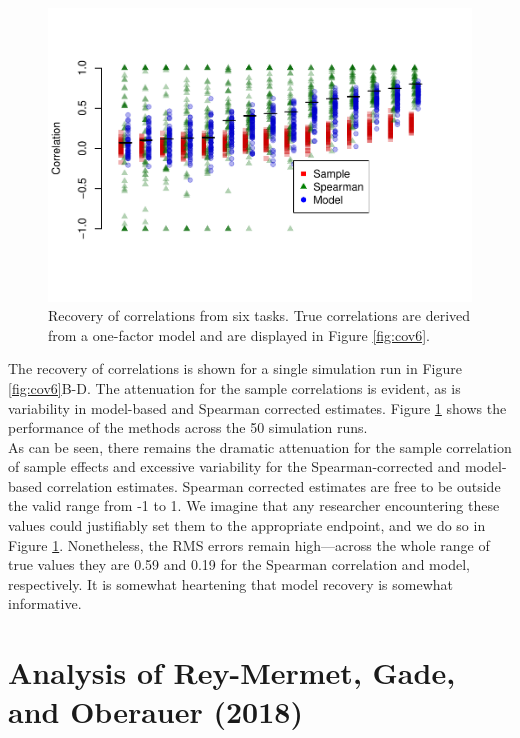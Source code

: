 \documentclass[
  ,man]{apa6}
\begin{document}
\begin{figure}
\centering
\includegraphics{p_files/figure-latex/recov6-1.pdf}
\caption{\label{fig:recov6}Recovery of correlations from six tasks. True correlations are derived from a one-factor model and are displayed in Figure \ref{fig:cov6}.}
\end{figure}

The recovery of correlations is shown for a single simulation run in Figure \ref{fig:cov6}B-D. The attenuation for the sample correlations is evident, as is variability in model-based and Spearman corrected estimates. Figure \ref{fig:recov6} shows the performance of the methods across the 50 simulation runs.\\
As can be seen, there remains the dramatic attenuation for the sample correlation of sample effects and excessive variability for the Spearman-corrected and model-based correlation estimates. Spearman corrected estimates are free to be outside the valid range from -1 to 1. We imagine that any researcher encountering these values could justifiably set them to the appropriate endpoint, and we do so in Figure \ref{fig:recov6}. Nonetheless, the RMS errors remain high---across the whole range of true values they are 0.59 and 0.19 for the Spearman correlation and model, respectively. It is somewhat heartening that model recovery is somewhat informative.

\hypertarget{analysis-of-rey-mermet-gade-and-oberauer-2018}{%
\section{Analysis of Rey-Mermet, Gade, and Oberauer (2018)}\label{analysis-of-rey-mermet-gade-and-oberauer-2018}}
\end{document}
